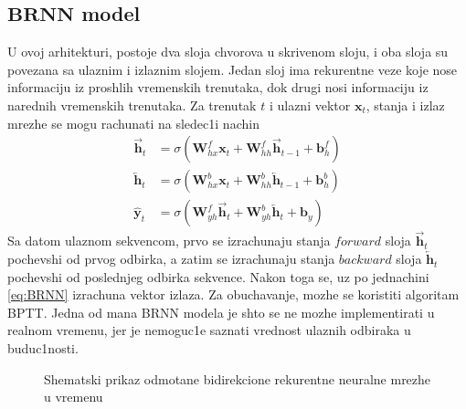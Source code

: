 \documentclass[a4paper, openany, oneside, 11pt]{book}
\begin{document}
\subsection[$BRNN$ model]{$\mathbf{BRNN}$ model}
U ovoj arhitekturi, postoje dva sloja chvorova u skrivenom sloju, i oba sloja su povezana sa ulaznim i izlaznim slojem. Jedan sloj ima rekurentne veze koje nose informaciju iz proshlih vremenskih trenutaka, dok drugi nosi informaciju iz narednih vremenskih trenutaka. Za trenutak $t$ i ulazni vektor $\mathbf{x}_{t}$, stanja i izlaz mrezhe se mogu rachunati na sledec1i nachin
\begin{align}
\overrightarrow{\mathbf{h}}_t &= \sigma\left(\mathbf{W}^f_{hx}\mathbf{x}_t+\mathbf{W}^f_{hh}\overrightarrow{\mathbf{h}}_{t-1}+\mathbf{b}_h^f\right)\\
\overleftarrow{\mathbf{h}}_t &= \sigma\left(\mathbf{W}^b_{hx}\mathbf{x}_t+\mathbf{W}^b_{hh}\overleftarrow{\mathbf{h}}_{t-1}+\mathbf{b}_h^b\right)\\
\mathbf{\hat{y}}_t&= \sigma\left(\mathbf{W}^f_{yh}\overrightarrow{\mathbf{h}}_t +\mathbf{W}^b_{yh}\overleftarrow{\mathbf{h}}_t+\mathbf{b}_y\right) \label{eq:BRNN}
\end{align}
Sa datom ulaznom sekvencom, prvo se izrachunaju stanja $forward$ sloja $\overrightarrow{\mathbf{h}}_t$ pochevshi od prvog odbirka, a zatim se izrachunaju stanja $backward$ sloja $\overleftarrow{\mathbf{h}}_t$ pochevshi od poslednjeg odbirka sekvence. Nakon toga se, uz po jednachini \ref{eq:BRNN} izrachuna vektor izlaza. Za obuchavanje, mozhe se koristiti algoritam \acrshort{BPTT}. Jedna od mana \acrshort{BRNN} modela je shto se ne mozhe implementirati u realnom vremenu, jer je nemoguc1e saznati vrednost ulaznih odbiraka u buduc1nosti.
\newpage
\begin{figure}[!h]
\hspace*{0.2\linewidth}
\caption{Shemat\-ski prikaz odmotane bidirekcione rekurentne neuralne mre\-zhe u vremenu}
\label{fig:12}
\end{figure}
\end{document}
